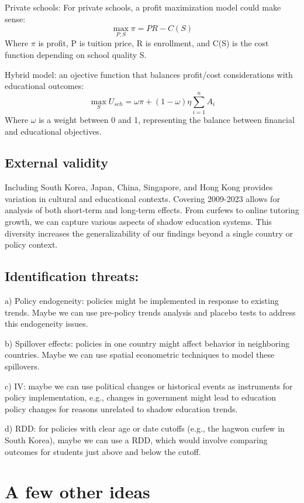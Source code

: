\documentclass[12pt,a4paper,onecolumn]{article}
\numberwithin{equation}{section}
\begin{document}
Private schools:
For private schools, a profit maximization model could make sense:
\[
\max_{P,S} \pi = PR - C(S)
\]
Where $\pi$ is profit, P is tuition price, R is enrollment, and C(S) is the cost function depending on school quality S.

Hybrid model: an ojective function that balances profit/cost considerations with educational outcomes:
\[
\max_{S} U_{sch} = \omega \pi + (1-\omega) \eta \sum_{i=1}^{n} A_i
\]
Where $\omega$ is a weight between 0 and 1, representing the balance between financial and educational objectives.

\subsection{External validity}

Including South Korea, Japan, China, Singapore, and Hong Kong provides variation in cultural and educational contexts. Covering 2009-2023 allows for analysis of both short-term and long-term effects. From curfews to online tutoring growth, we can capture various aspects of shadow education systems.
This diversity increases the generalizability of our findings beyond a single country or policy context. 

\subsection{Identification threats:}

a) Policy endogeneity: policies might be implemented in response to existing trends. Maybe we can use pre-policy trends analysis and placebo tests to address this endogeneity issues.

b) Spillover effects: policies in one country might affect behavior in neighboring countries. Maybe we can use spatial econometric techniques to model these spillovers.

c) IV: maybe we can use political changes or historical events as instruments for policy implementation, e.g., changes in government might lead to education policy changes for reasons unrelated to shadow education trends.

d) RDD: for policies with clear age or date cutoffs (e.g., the hagwon curfew in South Korea), maybe we can use a RDD, which would involve comparing outcomes for students just above and below the cutoff.

\section{A few other ideas}
\end{document}
